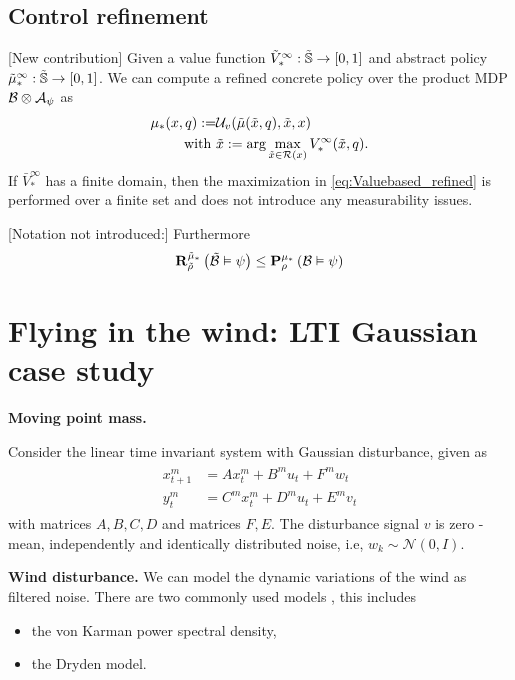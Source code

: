 \documentclass{ifacconf}
\newcommand{\red}[1]{{\color{red} #1}}
\begin{document}
\subsection{Control refinement}
\red{[New contribution]}
Given a value function 
	$\tilde V^\infty_\ast:\tilde\S \rightarrow [0,1]$ and abstract policy 	$\tilde  \pol^\infty_\ast:\tilde\S \rightarrow [0,1]$. We can compute a refined  concrete policy over the product MDP $\MB\otimes\FSA_\psi$ as
	\begin{align}\label{eq:Valuebased_refined}
		\pol_\ast(x,q):= &\InF( \tilde{\pol}(\tilde x, q), \tilde x, x) \\ \mbox{ with } &\tilde x:=\arg\max_{ \tilde x\in\rel(x)} \bar V^\infty_\ast(\tilde x,q).
	\end{align}
If  $\bar V^\infty_\ast$ has a finite domain, then  the maximization in \eqref{eq:Valuebased_refined} is performed over a finite set and does not introduce any measurability issues. 
	
	\red{[Notation not introduced:]}
	Furthermore
\begin{align}
  \mathbf R^{\tilde \pol_\ast}_{\tilde\rho}\left(
\tilde{\mathcal{B}}
 \vDash \psi \right)\leq   \mathbf P^{ \pol_\ast} _{ \rho}\left(
 {\mathcal{B}}
 \vDash \psi \right)
\end{align}
	


\section{Flying in the wind:  LTI Gaussian case study}



\noindent\textbf{Moving point mass.}
    
Consider the linear time invariant system with Gaussian disturbance, given as 
\begin{align}\begin{aligned}
	x^m_{t+1} &= A x^m_{t}+B^mu_{t}+ F^m w_{t}\\
	y^m_{t}&=C^m x^m_{t}+D^m u_{t}+E^m v_{t}\end{aligned}
\end{align}
with matrices $A,B,C,D$ and matrices $F,E$. 
The disturbance signal $v$ is zero -mean, independently and identically  distributed noise, i.e, $w_k\sim \mathcal{N}(0,I)$.

 
 \noindent\textbf{Wind disturbance.}
We can model the dynamic variations of the wind as filtered noise. 
There are two commonly used models  \citep{richardson2013quantifying},  this includes
\begin{itemize}
	\item the von Karman power spectral density,
	\item the Dryden model.
\end{itemize}
 
\end{document}
